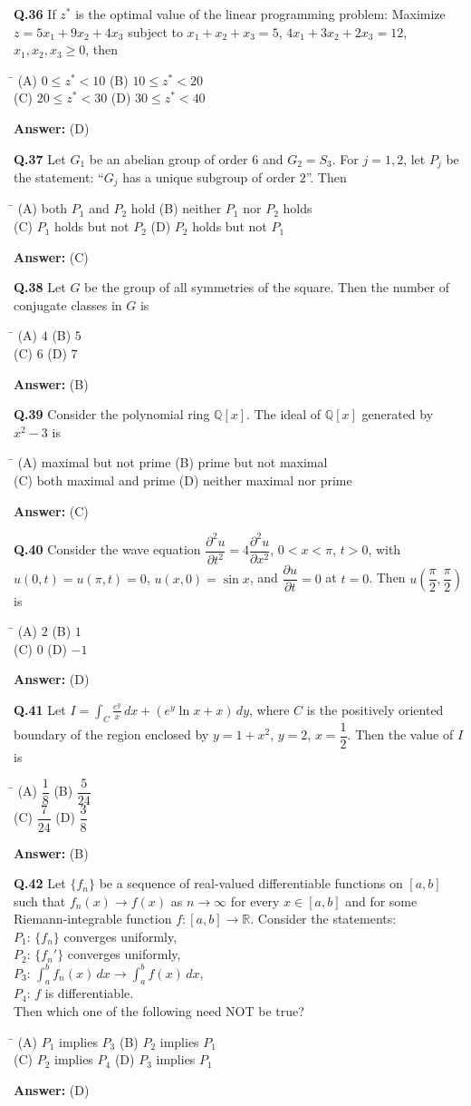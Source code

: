 \documentclass[11pt,a4paper]{article}
\newcommand{\optsfourA}[4]{%
  \begin{tabbing}
    \hspace{0.48\linewidth}\=\kill
    (A) #1 \> (B) #2 \\[2pt]
    (C) #3 \> (D) #4
  \end{tabbing}%
}
\newcommand{\ans}[1]{\textbf{Answer:} #1\par\medskip}
\begin{document}
\textbf{Q.36} If $z^*$ is the optimal value of the linear programming problem: Maximize $z = 5x_1 + 9x_2 + 4x_3$ subject to $x_1 + x_2 + x_3 = 5$, $4x_1 + 3x_2 + 2x_3 = 12$, $x_1, x_2, x_3 \ge 0$, then
\optsfourA{$0 \le z^* < 10$}{$10 \le z^* < 20$}{$20 \le z^* < 30$}{$30 \le z^* < 40$}
\ans{(D)}

\textbf{Q.37} Let $G_1$ be an abelian group of order $6$ and $G_2 = S_3$. For $j = 1, 2$, let $P_j$ be the statement: ``$G_j$ has a unique subgroup of order $2$''. Then
\optsfourA{both $P_1$ and $P_2$ hold}{neither $P_1$ nor $P_2$ holds}{$P_1$ holds but not $P_2$}{$P_2$ holds but not $P_1$}
\ans{(C)}

\textbf{Q.38} Let $G$ be the group of all symmetries of the square. Then the number of conjugate classes in $G$ is
\optsfourA{$4$}{$5$}{$6$}{$7$}
\ans{(B)}

\textbf{Q.39} Consider the polynomial ring $\mathbb{Q}[x]$. The ideal of $\mathbb{Q}[x]$ generated by $x^2 - 3$ is
\optsfourA{maximal but not prime}{prime but not maximal}{both maximal and prime}{neither maximal nor prime}
\ans{(C)}

\textbf{Q.40} Consider the wave equation $\dfrac{\partial^2 u}{\partial t^2} = 4\dfrac{\partial^2 u}{\partial x^2}$, $0 < x < \pi$, $t > 0$, with $u(0, t) = u(\pi, t) = 0$, $u(x, 0) = \sin x$, and $\dfrac{\partial u}{\partial t} = 0$ at $t = 0$. Then $u\!\left(\dfrac{\pi}{2}, \dfrac{\pi}{2}\right)$ is
\optsfourA{$2$}{$1$}{$0$}{$-1$}
\ans{(D)}

\textbf{Q.41} Let $I = \displaystyle\int_C \frac{e^y}{x}\,dx + (e^y \ln x + x)\,dy$, where $C$ is the positively oriented boundary of the region enclosed by $y = 1 + x^2$, $y = 2$, $x = \dfrac{1}{2}$. Then the value of $I$ is
\optsfourA{$\dfrac{1}{8}$}{$\dfrac{5}{24}$}{$\dfrac{7}{24}$}{$\dfrac{3}{8}$}
\ans{(B)}

\textbf{Q.42} Let $\{f_n\}$ be a sequence of real-valued differentiable functions on $[a, b]$ such that $f_n(x) \to f(x)$ as $n \to \infty$ for every $x \in [a, b]$ and for some Riemann-integrable function $f : [a, b] \to \mathbb{R}$. Consider the statements:\\
$P_1$: $\{f_n\}$ converges uniformly,\\
$P_2$: $\{f_n'\}$ converges uniformly,\\
$P_3$: $\displaystyle\int_a^b f_n(x)\,dx \to \int_a^b f(x)\,dx$,\\
$P_4$: $f$ is differentiable.\\
Then which one of the following need NOT be true?
\optsfourA{$P_1$ implies $P_3$}{$P_2$ implies $P_1$}{$P_2$ implies $P_4$}{$P_3$ implies $P_1$}
\ans{(D)}
\end{document}
